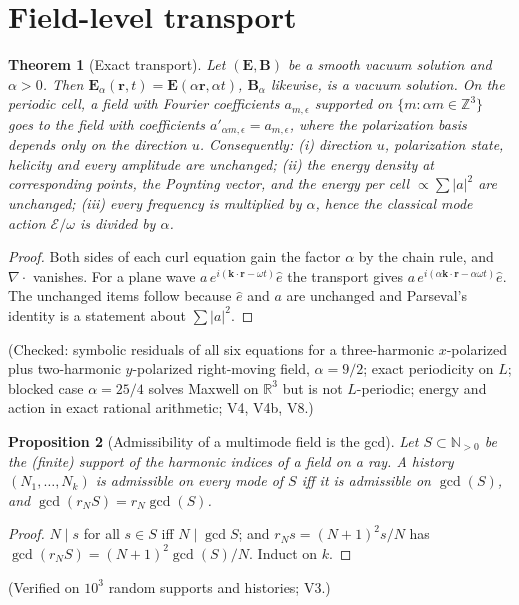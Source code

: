 \documentclass[11pt,a4paper]{article}
\newtheorem{theorem}{Theorem}[section]
\newtheorem{proposition}[theorem]{Proposition}
\theoremstyle{definition}
\theoremstyle{remark}
\newcommand{\N}{\mathbb N}\newcommand{\Q}{\mathbb Q}\newcommand{\R}{\mathbb R}\newcommand{\Z}{\mathbb Z}
\newcommand{\bE}{\mathbf E}\newcommand{\bB}{\mathbf B}
\begin{document}
\section{Field-level transport}
\begin{theorem}[Exact transport]\label{thm:tr}
Let $(\bE,\bB)$ be a smooth vacuum solution and $\alpha>0$. Then $\bE_\alpha(\mathbf r,t)=\bE(\alpha\mathbf r,\alpha t)$, $\bB_\alpha$ likewise, is a vacuum solution. On the periodic cell, a field with Fourier coefficients $a_{m,\epsilon}$ supported on $\{m:\alpha m\in\Z^3\}$ goes to the field with coefficients $a'_{\alpha m,\epsilon}=a_{m,\epsilon}$, where the polarization basis depends only on the direction $u$. Consequently: (i) direction $u$, polarization state, helicity and every amplitude are unchanged; (ii) the energy density at corresponding points, the Poynting vector, and the energy per cell $\propto\sum|a|^2$ are unchanged; (iii) every frequency is multiplied by $\alpha$, hence the classical mode action $\mathcal E/\omega$ is divided by $\alpha$.
\end{theorem}
\begin{proof}
Both sides of each curl equation gain the factor $\alpha$ by the chain rule, and $\nabla\!\cdot$ vanishes. For a plane wave $a\,e^{i(\mathbf k\cdot\mathbf r-\omega t)}\hat e$ the transport gives $a\,e^{i(\alpha\mathbf k\cdot\mathbf r-\alpha\omega t)}\hat e$. The unchanged items follow because $\hat e$ and $a$ are unchanged and Parseval's identity is a statement about $\sum|a|^2$.
\end{proof}
(Checked: symbolic residuals of all six equations for a three-harmonic $x$-polarized plus two-harmonic $y$-polarized right-moving field, $\alpha=9/2$; exact periodicity on $L$; blocked case $\alpha=25/4$ solves Maxwell on $\R^3$ but is not $L$-periodic; energy and action in exact rational arithmetic; V4, V4b, V8.)

\begin{proposition}[Admissibility of a multimode field is the gcd]\label{prop:gcd}
Let $S\subset\N_{>0}$ be the (finite) support of the harmonic indices of a field on a ray. A history $(N_1,\dots,N_k)$ is admissible on every mode of $S$ iff it is admissible on $\gcd(S)$, and $\gcd(r_NS)=r_N\gcd(S)$.
\end{proposition}
\begin{proof}
$N\mid s$ for all $s\in S$ iff $N\mid\gcd S$; and $r_Ns=(N+1)^2s/N$ has $\gcd(r_NS)=(N+1)^2\gcd(S)/N$. Induct on $k$.
\end{proof}
(Verified on $10^3$ random supports and histories; V3.)
\end{document}
